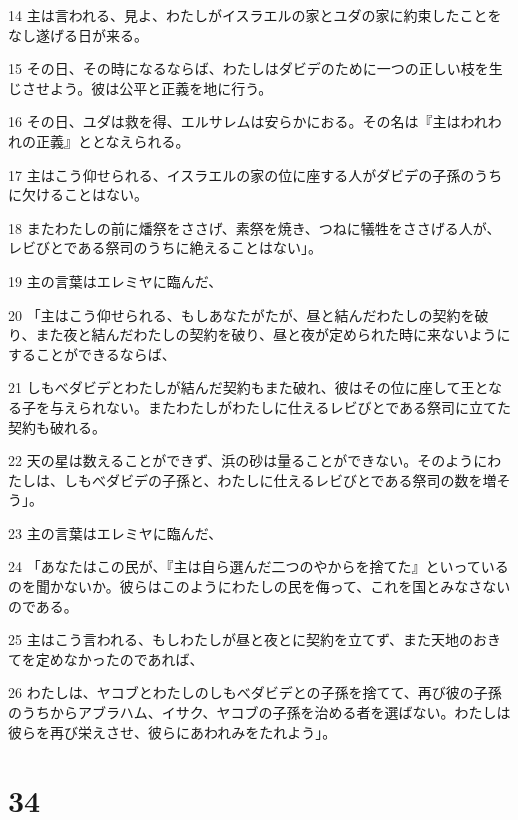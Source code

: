 \par 14 主は言われる、見よ、わたしがイスラエルの家とユダの家に約束したことをなし遂げる日が来る。
\par 15 その日、その時になるならば、わたしはダビデのために一つの正しい枝を生じさせよう。彼は公平と正義を地に行う。
\par 16 その日、ユダは救を得、エルサレムは安らかにおる。その名は『主はわれわれの正義』ととなえられる。
\par 17 主はこう仰せられる、イスラエルの家の位に座する人がダビデの子孫のうちに欠けることはない。
\par 18 またわたしの前に燔祭をささげ、素祭を焼き、つねに犠牲をささげる人が、レビびとである祭司のうちに絶えることはない」。
\par 19 主の言葉はエレミヤに臨んだ、
\par 20 「主はこう仰せられる、もしあなたがたが、昼と結んだわたしの契約を破り、また夜と結んだわたしの契約を破り、昼と夜が定められた時に来ないようにすることができるならば、
\par 21 しもべダビデとわたしが結んだ契約もまた破れ、彼はその位に座して王となる子を与えられない。またわたしがわたしに仕えるレビびとである祭司に立てた契約も破れる。
\par 22 天の星は数えることができず、浜の砂は量ることができない。そのようにわたしは、しもべダビデの子孫と、わたしに仕えるレビびとである祭司の数を増そう」。
\par 23 主の言葉はエレミヤに臨んだ、
\par 24 「あなたはこの民が、『主は自ら選んだ二つのやからを捨てた』といっているのを聞かないか。彼らはこのようにわたしの民を侮って、これを国とみなさないのである。
\par 25 主はこう言われる、もしわたしが昼と夜とに契約を立てず、また天地のおきてを定めなかったのであれば、
\par 26 わたしは、ヤコブとわたしのしもべダビデとの子孫を捨てて、再び彼の子孫のうちからアブラハム、イサク、ヤコブの子孫を治める者を選ばない。わたしは彼らを再び栄えさせ、彼らにあわれみをたれよう」。

\chapter{34}

